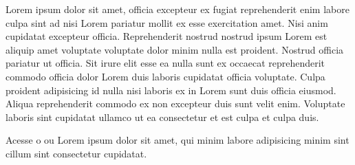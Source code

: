 \documentclass[12pt]{../libellum}
\begin{document}
Lorem ipsum dolor sit amet, officia excepteur ex fugiat reprehenderit enim 
labore culpa sint ad nisi Lorem pariatur mollit ex esse exercitation amet. 
Nisi anim cupidatat excepteur officia. 
Reprehenderit nostrud nostrud ipsum Lorem est aliquip amet voluptate 
voluptate dolor minim nulla est proident. 
Nostrud officia pariatur ut officia. 
Sit irure elit esse ea nulla sunt ex occaecat reprehenderit commodo 
officia dolor Lorem duis laboris cupidatat officia voluptate. 
Culpa proident adipisicing id nulla nisi laboris ex in Lorem sunt duis 
officia eiusmod. 
Aliqua reprehenderit commodo ex non excepteur duis sunt velit enim. 
Voluptate laboris sint cupidatat ullamco ut ea consectetur et est culpa et 
culpa duis.

Acesse o  ou Lorem 
ipsum dolor sit amet, qui minim labore adipisicing minim sint cillum sint 
consectetur cupidatat.

\begin{center}
\end{center}

\end{document}
